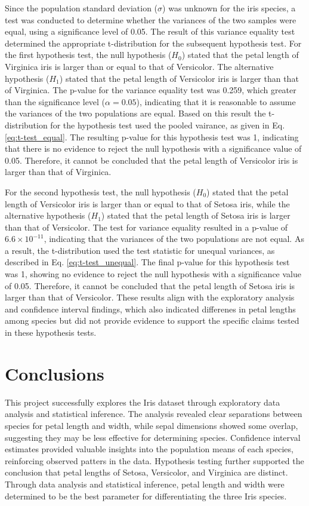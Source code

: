 \documentclass{article}
\begin{document}
Since the population standard deviation ($\sigma$) was unknown for the iris species, a test was conducted to determine whether the variances of the two samples were equal, using a significance level of 0.05. The result of this variance equality test determined the appropriate t-distribution for the subsequent hypothesis test. For the first hypothesis test, the null hypothesis  ($H_0$) stated that the petal length of Virginica iris is larger than or equal to that of Versicolor. The alternative hypothesis ($H_1$) stated that the petal length of Versicolor iris is larger than that of Virginica. The p-value for the variance equality test was 0.259, which greater than the significance level ($\alpha = 0.05$), indicating that it is reasonable to assume the variances of the two populations are equal. Based on this result the t-distribution for the hypothesis test used the pooled vairance, as given in Eq. \ref{eq:t-test_equal}. The resulting p-value for this hypothesis test was 1, indicating that there is no evidence to reject the null hypothesis with a significance value of 0.05. Therefore, it cannot be concluded that the petal length of Versicolor iris is larger than that of Virginica.

 For the second hypothesis test, the null hypothesis ($H_0$) stated that the petal length of Versicolor iris is larger than or equal to that of Setosa iris, while the alternative hypothesis ($H_1$) stated that the petal length of Setosa iris is larger than that of Versicolor. The test for variance equality resulted in a p-value of $6.6\times10^{-11}$, indicating that the variances of the two populations are not equal. As a result, the t-distribution used the test statistic for unequal variances, as described in Eq. \ref{eq:t-test_unequal}. The final p-value for this hypothesis test was 1, showing no evidence to reject the null hypothesis with a significance value of 0.05. Therefore, it cannot be concluded that the petal length of Setosa iris is larger than that of Versicolor. These results align with the exploratory analysis and confidence interval findings, which also indicated differenes in petal lengths among species but did not provide evidence to support the specific claims tested in these hypothesis tests. 

\section{Conclusions}
This project successfully explores the Iris dataset through exploratory data analysis and statistical inference. The analysis revealed clear separations between species for petal length and width, while sepal dimensions showed some overlap, suggesting they may be less effective for determining species. Confidence interval estimates provided valuable insights into the population means of each species, reinforcing observed patters in the data. Hypothesis testing further supported the conclusion that petal lengths of Setosa, Versicolor, and Virginica are distinct. Through data analysis and statistical inference, petal length and width were determined to be the best parameter for differentiating the three Iris species. 
\end{document}
